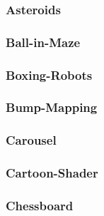 \documentclass[a4paper]{article}
\begin{document}
\clearpage\subsubsection[Asteroids]{Asteroids}
\hypertarget{RefHeading20131167907073}{}\subsubsection{}
\clearpage\subsubsection[Ball{}-in{}-Maze]{Ball-in-Maze}
\hypertarget{RefHeading23611167907073}{}\subsubsection{}
\clearpage\subsubsection[Boxing{}-Robots]{Boxing-Robots}
\hypertarget{RefHeading23631167907073}{}\subsubsection{}
\clearpage\subsubsection[Bump{}-Mapping]{Bump-Mapping}
\hypertarget{RefHeading23651167907073}{}\subsubsection{}
\clearpage\subsubsection[Carousel]{Carousel}
\hypertarget{RefHeading23671167907073}{}\subsubsection{}
\clearpage\subsubsection[Cartoon{}-Shader]{Cartoon-Shader}
\hypertarget{RefHeading23691167907073}{}\subsubsection{}
\clearpage\subsubsection[Chessboard]{Chessboard}
\end{document}

